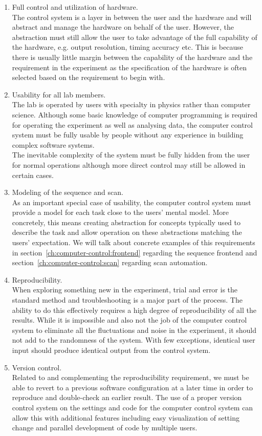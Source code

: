 \begin{enumerate}
\item Full control and utilization of hardware.\\
  The control system is a layer in between the user and the hardware
  and will abstract and manage the hardware on behalf of the user.
  However, the abstraction must still allow the user to take advantage of
  the full capability of the hardware, e.g. output resolution, timing accuracy etc.
  This is because there is usually little margin between the capability of the hardware
  and the requirement in the experiment as the specification of the hardware
  is often selected based on the requirement to begin with.
\item Usability for all lab members.\\
  The lab is operated by users with specialty in physics rather than computer science.
  Although some basic knowledge of computer programming is required for operating
  the experiment as well as analysing data,
  the computer control system must be fully usable by people without any experience
  in building complex software systems.\\
  The inevitable complexity of the system must be fully hidden from the user
  for normal operations although more direct control may still be allowed in certain cases.
\item Modeling of the sequence and scan.\\
  As an important special case of usability,
  the computer control system must provide a model for each task close to
  the users' mental model.
  More concretely, this means creating abstraction for concepts
  typically used to describe the task and allow operation on these abstractions
  matching the users' expectation.
  We will talk about concrete examples of this requirements
  in section~\ref{ch:computer-control:frontend} regarding the sequence frontend
  and section~\ref{ch:computer-control:scan} regarding scan automation.
\item Reproducibility.\\
  When exploring something new in the experiment,
  trial and error is the standard method and troubleshooting is a major part of the process.
  The ability to do this effectively requires a high degree of reproducibility of all the results.
  While it is impossible and also not the job of the computer control system to
  eliminate all the fluctuations and noise in the experiment,
  it should not add to the randomness of the system.
  With few exceptions, identical user input should produce identical output from
  the control system.
\item Version control.\\
  Related to and complementing the reproducibility requirement,
  we must be able to revert to a previous software configuration at a later time
  in order to reproduce and double-check an earlier result.
  The use of a proper version control system on the settings and code for
  the computer control system can allow this with additional features
  including easy visualization of setting change and parallel development of code
  by multiple users.
\end{enumerate}

